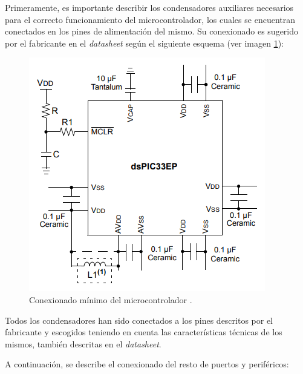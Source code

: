 Primeramente, es importante describir los condensadores auxiliares necesarios para el correcto funcionamiento del microcontrolador, los cuales se encuentran conectados en los pines de alimentación del mismo. Su conexionado es sugerido por el fabricante en el \textit{datasheet} según el siguiente esquema (ver imagen \ref{fig:Conexionado_Minimo}):

\begin{figure}[H]
    \centering 
    \includegraphics[width=.7\linewidth]{pictures/Minimun.PNG}
    \caption{Conexionado mínimo del microcontrolador \cite{DsPIC33EP512GM60416BitMicrocontrollers}.}
    \label{fig:Conexionado_Minimo}
\end{figure}

Todos los condensadores han sido conectados a los pines descritos por el fabricante y escogidos teniendo en cuenta las características técnicas de los mismos, también descritas en el \textit{datasheet}.

A continuación, se describe el conexionado del resto de puertos y periféricos:

